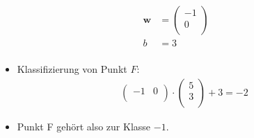 \begin{frame}
\begin{figure}[h]
\begin{minipage}{0.4\textwidth}
\begin{itemize}
                    \begin{align*}
                        \boldsymbol{w} &= \left( \begin{matrix}
                            -1 \\
                            0 \\
                        \end{matrix} \right) \\
                        b &= 3 \\ 
                    \end{align*}
            \end{itemize} 
        \end{minipage}
    \end{figure}

    \begin{itemize}
        \item<1-> Klassifizierung von Punkt $F$:
            \begin{align*}
                \left( \begin{matrix}
                    -1 & 0 \\
                \end{matrix} \right) \cdot \left( \begin{matrix}
                    5 \\
                    3 \\
                \end{matrix} \right) + 3 = -2
            \end{align*}
        \item<1-> Punkt F gehört also zur Klasse $-1$.
    \end{itemize}
\end{frame}

